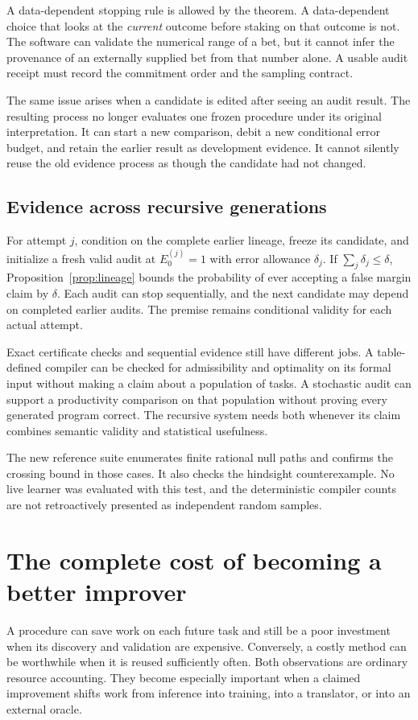 \documentclass[11pt,letterpaper]{article}
\theoremstyle{plain}
\theoremstyle{definition}
\begin{document}
A data-dependent stopping rule is allowed by the theorem. A data-dependent choice that looks at the \emph{current} outcome before staking on that outcome is not. The software can validate the numerical range of a bet, but it cannot infer the provenance of an externally supplied bet from that number alone. A usable audit receipt must record the commitment order and the sampling contract.

The same issue arises when a candidate is edited after seeing an audit result. The resulting process no longer evaluates one frozen procedure under its original interpretation. It can start a new comparison, debit a new conditional error budget, and retain the earlier result as development evidence. It cannot silently reuse the old evidence process as though the candidate had not changed.

\subsection{Evidence across recursive generations}
For attempt $j$, condition on the complete earlier lineage, freeze its candidate, and initialize a fresh valid audit at $E_0^{(j)}=1$ with error allowance $\delta_j$. If $\sum_j\delta_j\leq\delta$, Proposition~\ref{prop:lineage} bounds the probability of ever accepting a false margin claim by $\delta$. Each audit can stop sequentially, and the next candidate may depend on completed earlier audits. The premise remains conditional validity for each actual attempt.

Exact certificate checks and sequential evidence still have different jobs. A table-defined compiler can be checked for admissibility and optimality on its formal input without making a claim about a population of tasks. A stochastic audit can support a productivity comparison on that population without proving every generated program correct. The recursive system needs both whenever its claim combines semantic validity and statistical usefulness.

The new reference suite enumerates finite rational null paths and confirms the crossing bound in those cases. It also checks the hindsight counterexample. No live learner was evaluated with this test, and the deterministic compiler counts are not retroactively presented as independent random samples.

\section{The complete cost of becoming a better improver}\label{sec:cost}
A procedure can save work on each future task and still be a poor investment when its discovery and validation are expensive. Conversely, a costly method can be worthwhile when it is reused sufficiently often. Both observations are ordinary resource accounting. They become especially important when a claimed improvement shifts work from inference into training, into a translator, or into an external oracle.
\end{document}
